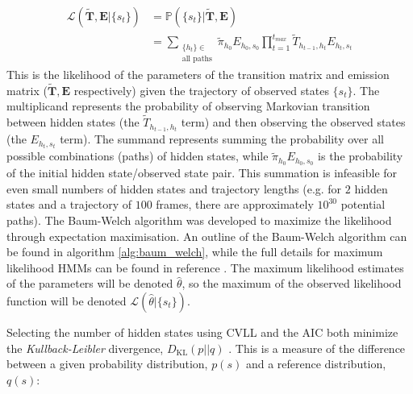 \begin{equation}\label{eqn:obs_lik_full}
\begin{split}
    \mathcal{L}\left(\tilde{\mathbf{T}}, \mathbf{E}| \{s_t\}\right) & = \mathbb{P}\left(\{s_t\} | \tilde{\mathbf{T}}, \mathbf{E}\right) \\
    & = \sum_{\substack{\{h_t\} \in \\ \text{all paths}}} \tilde{\pi}_{h_{0}}E_{h_{0},s_{0}}\prod_{t=1}^{t_{max}}\tilde{T}_{h_{t-1}, h_t}E_{h_t, s_t}    
\end{split}
\end{equation}
This is the likelihood of the parameters of the transition matrix and emission matrix ($\tilde{\mathbf{T}}, \mathbf{E}$ respectively) given the trajectory of observed states $\{s_t\}$. The multiplicand represents the probability of observing Markovian transition between hidden states (the $\tilde{T}_{h_{t-1}, h_{t}}$ term) and then  observing the observed states (the $E_{h_t, s_t}$ term). The summand represents summing the probability over all possible combinations (paths) of hidden states, while $\tilde{\pi}_{h_{0}}E_{ h_{0}, s_{0}}$ is the probability of the initial hidden state/observed state pair. This summation is infeasible for even small numbers of hidden states and trajectory lengths (e.g. for $2$ hidden states and a trajectory of $100$ frames, there are approximately $10^{30}$ potential paths). The Baum-Welch algorithm \cite{rabinerTutorialHiddenMarkov1989} was developed to maximize the likelihood through expectation maximisation. An outline of the Baum-Welch algorithm can be found in algorithm \ref{alg:baum_welch}, while the full details for maximum likelihood HMMs can be found in reference \cite{noeProjectedHiddenMarkov2013a}. The maximum likelihood estimates of the parameters will be denoted $\hat{\theta}$, so the maximum of the observed likelihood function will be denoted $\mathcal{L}\left(\hat{\theta}|\{s_t\}\right)$. 

Selecting the number of hidden states using CVLL and the AIC both minimize the \emph{Kullback-Leibler} divergence, $D_{\mathrm{KL}}(p||q)$ \cite{mclachlanFiniteMixtureModels2000}. This is a measure of the difference between a given probability distribution, $p(s)$ and a reference distribution, $q(s)$: 

